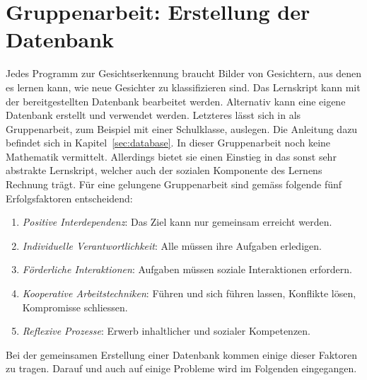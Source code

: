 \section{Gruppenarbeit: Erstellung der Datenbank}
Jedes Programm zur Gesichtserkennung braucht Bilder von Gesichtern, aus denen es \glqq{}lernen\grqq{} kann, wie neue Gesichter zu klassifizieren sind.
Das Lernskript kann mit der bereitgestellten Datenbank bearbeitet werden.
Alternativ kann eine eigene Datenbank erstellt und verwendet werden.
Letzteres lässt sich in als Gruppenarbeit, zum Beispiel mit einer Schulklasse, auslegen.
Die Anleitung dazu befindet sich in Kapitel~\ref{sec:database}.
In dieser Gruppenarbeit noch keine Mathematik vermittelt.
Allerdings bietet sie einen Einstieg in das sonst sehr abstrakte Lernskript, welcher auch der sozialen Komponente des Lernens Rechnung trägt.
Für eine gelungene Gruppenarbeit sind gemäss \cite{Bosch2019} folgende fünf Erfolgsfaktoren entscheidend:
\begin{enumerate}[label=\arabic*.]
	\item \textit{Positive Interdependenz}: Das Ziel kann nur gemeinsam erreicht werden.
	\item \textit{Individuelle Verantwortlichkeit}: Alle müssen ihre Aufgaben
erledigen.
	\item \textit{Förderliche Interaktionen}: Aufgaben müssen soziale Interaktionen erfordern.
	\item \textit{Kooperative Arbeitstechniken}: Führen und sich führen lassen, Konflikte lösen, Kompromisse schliessen.
	\item \textit{Reflexive Prozesse}: Erwerb inhaltlicher und sozialer Kompetenzen.
\end{enumerate}
Bei der gemeinsamen Erstellung einer Datenbank kommen einige dieser Faktoren zu tragen.
Darauf und auch auf einige Probleme wird im Folgenden eingegangen.
